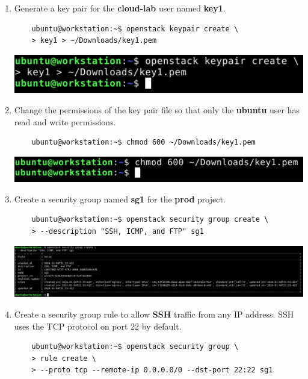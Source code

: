 \documentclass[letterpaper, 12pt]{article}
\begin{document}
\begin{enumerate}
    \item Generate a key pair for the \textbf{cloud-lab} user named \textbf{key1}.
    \begin{lstlisting}
    ubuntu@workstation:~$ openstack keypair create \
    > key1 > ~/Downloads/key1.pem
    \end{lstlisting}

    \begin{center}
        \includegraphics[width=\linewidth]{images/part1/step27.png}
    \end{center}

    \item Change the permissions of the key pair file so that only the \textbf{ubuntu} user has read and write
    permissions.
    \begin{lstlisting}
    ubuntu@workstation:~$ chmod 600 ~/Downloads/key1.pem
    \end{lstlisting}

    \begin{center}
        \includegraphics[width=\linewidth]{images/part1/step28.png}
    \end{center}

    \item Create a security group named \textbf{sg1} for the \textbf{prod} project.
    \begin{lstlisting}
    ubuntu@workstation:~$ openstack security group create \
    > --description "SSH, ICMP, and FTP" sg1
    \end{lstlisting}    

    \begin{center}
        \includegraphics[width=\linewidth]{images/part1/step29.png}
    \end{center}

    \item Create a security group rule to allow \textbf{SSH} traffic from any IP address. SSH uses the TCP protocol on
    port 22 by default.
    \begin{lstlisting}
    ubuntu@workstation:~$ openstack security group \
    > rule create \
    > --proto tcp --remote-ip 0.0.0.0/0 --dst-port 22:22 sg1
    \end{lstlisting}


\end{enumerate}
\end{document}
